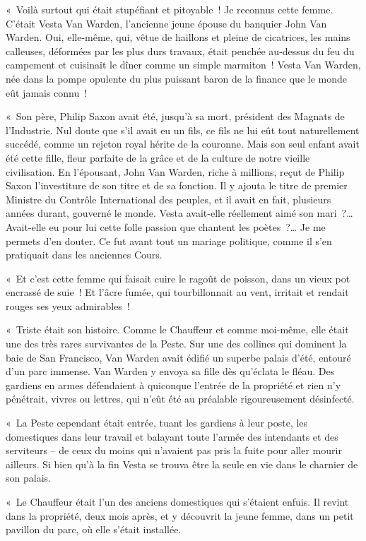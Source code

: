 \documentclass[french,twoside]{book} %
\begin{document}
« Voilà surtout qui était stupéfiant et pitoyable ! Je reconnus cette femme. C’était Vesta Van Warden, l’ancienne jeune épouse du banquier John Van Warden. Oui, elle-même, qui, vêtue de haillons et pleine de cicatrices, les mains calleuses, déformées par les plus durs travaux, était penchée au-dessus du feu du campement et cuisinait le dîner comme un simple marmiton ! Vesta Van Warden, née dans la pompe opulente du plus puissant baron de la finance que le monde eût jamais connu !\par
« Son père, Philip Saxon avait été, jusqu’à sa mort, président des Magnats de l’Industrie. Nul doute que s’il avait eu un fils, ce fils ne lui eût tout naturellement succédé, comme un rejeton royal hérite de la couronne. Mais son seul enfant avait été cette fille, fleur parfaite de la grâce et de la culture de notre vieille civilisation. En l’épousant, John Van Warden, riche à millions, reçut de Philip Saxon l’investiture de son titre et de sa fonction. Il y ajouta le titre de premier Ministre du Contrôle International des peuples, et il avait en fait, plusieurs années durant, gouverné le monde. Vesta avait-elle réellement aimé son mari ?… Avait-elle eu pour lui cette folle passion que chantent les poètes ?… Je me permets d’en douter. Ce fut avant tout un mariage politique, comme il s’en pratiquait dans les anciennes Cours.\par
« Et c’est cette femme qui faisait cuire le ragoût de poisson, dans un vieux pot encrassé de suie ! Et l’âcre fumée, qui tourbillonnait au vent, irritait et rendait rouges ses yeux admirables !\par
« Triste était son histoire. Comme le Chauffeur et comme moi-même, elle était une des très rares survivantes de la Peste. Sur une des collines qui dominent la baie de San Francisco, Van Warden avait édifié un superbe palais d’été, entouré d’un parc immense. Van Warden y envoya sa fille dès qu’éclata le fléau. Des gardiens en armes défendaient à quiconque l’entrée de la propriété et rien n’y pénétrait, vivres ou lettres, qui n’eût été au préalable rigoureusement désinfecté.\par
« La Peste cependant était entrée, tuant les gardiens à leur poste, les domestiques dans leur travail et balayant toute l’armée des intendants et des serviteurs – de ceux du moins qui n’avaient pas pris la fuite pour aller mourir ailleurs. Si bien qu’à la fin Vesta se trouva être la seule en vie dans le charnier de son palais.\par
« Le Chauffeur était l’un des anciens domestiques qui s’étaient enfuis. Il revint dans la propriété, deux mois après, et y découvrit la jeune femme, dans un petit pavillon du parc, où elle s’était installée.\par
\end{document}

